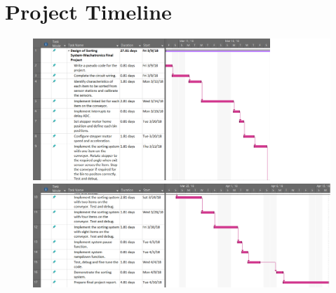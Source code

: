 \section{Project Timeline}\label{sec:timeline}
\begin{figure}[tbph]
	\centering
	\includegraphics[width=1\linewidth]{"images/timeline"}
	\label{fig:ABCD}
\end{figure}